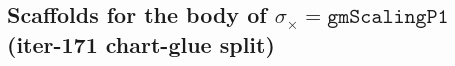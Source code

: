 \subsection*{Scaffolds for the body of \(\sigma_\times = \mathtt{gmScalingP1}\) (iter-171 chart-glue split)}
  
